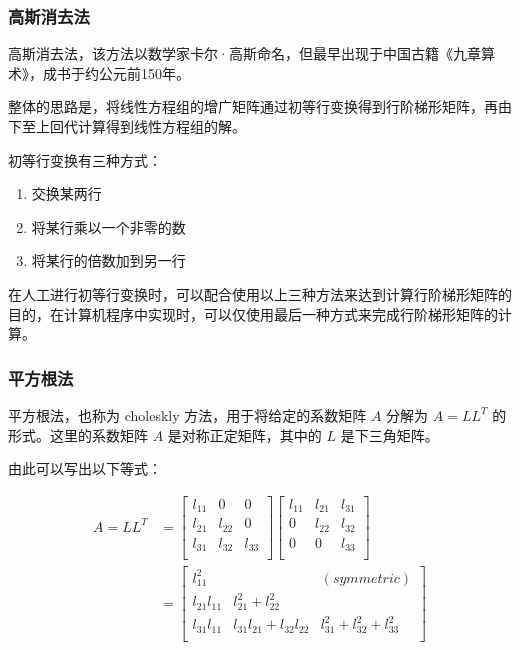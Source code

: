 \subsubsection{高斯消去法}

高斯消去法，该方法以数学家卡尔·高斯命名，但最早出现于中国古籍《九章算术》，成书于约公元前150年。

整体的思路是，将线性方程组的增广矩阵通过初等行变换得到行阶梯形矩阵，再由下至上回代计算得到线性方程组的解。

初等行变换有三种方式：

\begin{enumerate}
    \item 交换某两行
    \item 将某行乘以一个非零的数
    \item 将某行的倍数加到另一行
\end{enumerate}

在人工进行初等行变换时，可以配合使用以上三种方法来达到计算行阶梯形矩阵的目的，在计算机程序中实现时，可以仅使用最后一种方式来完成行阶梯形矩阵的计算。


\subsubsection{平方根法}

平方根法，也称为 choleskly 方法，用于将给定的系数矩阵 \(A\) 分解为
\(A = L L^T\) 的形式。这里的系数矩阵 \(A\) 是对称正定矩阵，其中的 \(L\)
是下三角矩阵。

由此可以写出以下等式：

\begin{equation*}
    \begin{aligned}
        A = LL^T & =
        \begin{bmatrix}
            l_{11} & 0      & 0      \\
            l_{21} & l_{22} & 0      \\
            l_{31} & l_{32} & l_{33} \\
        \end{bmatrix}
        \begin{bmatrix}
            l_{11} & l_{21} & l_{31} \\
            0      & l_{22} & l_{32} \\
            0      & 0      & l_{33} \\
        \end{bmatrix} \\
                 & =
        \begin{bmatrix}
            l_{11}^2     &                             & (symmetric)                     \\
            l_{21}l_{11} & l_{21}^2 + l_{22}^2                                           \\
            l_{31}l_{11} & l_{31}l_{21} + l_{32}l_{22} & l_{31}^2 + l_{32}^2 + l_{33} ^2 \\
        \end{bmatrix}
    \end{aligned}
\end{equation*}

